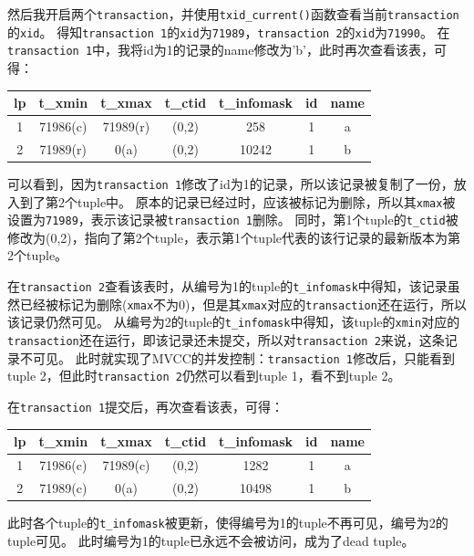 \documentclass[a4paper,10pt]{ctexart}
\begin{document}
然后我开启两个\texttt{transaction}，并使用\texttt{txid\_current()}函数查看当前\texttt{transaction}的\texttt{xid}。
得知\texttt{transaction 1}的\texttt{xid}为\texttt{71989}，\texttt{transaction 2}的\texttt{xid}为\texttt{71990}。
在\texttt{transaction 1}中，我将id为1的记录的name修改为'b'，此时再次查看该表，可得：
\begin{center}
    \begin{tabular}{ccccccc}
        \toprule
        lp & t\_xmin & t\_xmax & t\_ctid & t\_infomask & id & name \\
        \midrule
        1 & 71986(c) & 71989(r) & (0,2) & 258 & 1 & a \\
        2 & 71989(r) & 0(a) & (0,2) & 10242 & 1 & b \\
        \bottomrule
    \end{tabular}
\end{center}

可以看到，因为\texttt{transaction 1}修改了id为1的记录，所以该记录被复制了一份，放入到了第2个tuple中。
原本的记录已经过时，应该被标记为删除，所以其\texttt{xmax}被设置为\texttt{71989}，表示该记录被\texttt{transaction 1}删除。
同时，第1个tuple的\texttt{t\_ctid}被修改为(0,2)，指向了第2个tuple，表示第1个tuple代表的该行记录的最新版本为第2个tuple。

在\texttt{transaction 2}查看该表时，从编号为1的tuple的\texttt{t\_infomask}中得知，该记录虽然已经被标记为删除(\texttt{xmax}不为0)，但是其\texttt{xmax}对应的\texttt{transaction}还在运行，所以该记录仍然可见。
从编号为2的tuple的\texttt{t\_infomask}中得知，该tuple的\texttt{xmin}对应的\texttt{transaction}还在运行，即该记录还未提交，所以对\texttt{transaction 2}来说，这条记录不可见。
此时就实现了MVCC的并发控制：\texttt{transaction 1}修改后，只能看到tuple 2，但此时\texttt{transaction 2}仍然可以看到tuple 1，看不到tuple 2。

在\texttt{transaction 1}提交后，再次查看该表，可得：
\begin{center}
    \begin{tabular}{ccccccc}
        \toprule
        lp & t\_xmin & t\_xmax & t\_ctid & t\_infomask & id & name \\
        \midrule
        1 & 71986(c) & 71989(c) & (0,2) & 1282 & 1 & a \\
        2 & 71989(c) & 0(a) & (0,2) & 10498 & 1 & b \\
        \bottomrule
    \end{tabular}
\end{center}

此时各个tuple的\texttt{t\_infomask}被更新，使得编号为1的tuple不再可见，编号为2的tuple可见。
此时编号为1的tuple已永远不会被访问，成为了dead tuple。
\end{document}
